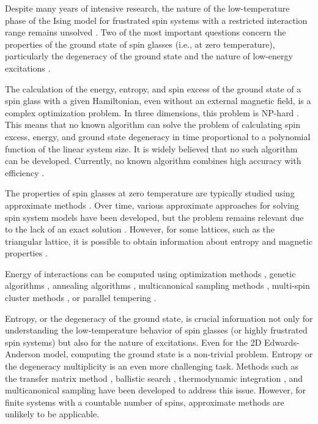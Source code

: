 \documentclass[preprint,12pt]{elsarticle}
\begin{document}
	Despite many years of intensive research, the nature of the low-temperature phase of the Ising model for frustrated spin systems with a restricted interaction range remains unsolved \cite{roma2010ground, newman2023proof}. Two of the most important questions concern the properties of the ground state of spin glasses (i.e., at zero temperature), particularly the degeneracy of the ground state and the nature of low-energy excitations \cite{newman2022ground}.
	
	The calculation of the energy, entropy, and spin excess of the ground state of a spin glass with a given Hamiltonian, even without an external magnetic field, is a complex optimization problem. In three dimensions, this problem is NP-hard \cite{barahona1982computational, hartmann2002optimization}. This means that no known algorithm can solve the problem of calculating spin excess, energy, and ground state degeneracy in time proportional to a polynomial function of the linear system size. It is widely believed that no such algorithm can be developed. Currently, no known algorithm combines high accuracy with efficiency \cite{fan2023searching}.
		
	The properties of spin glasses at zero temperature are typically studied using approximate methods \cite{roma2009ground, perez2012ground}. Over time, various approximate approaches for solving spin system models have been developed, but the problem remains relevant due to the lack of an exact solution \cite{rybin2022hybrid, makarova2023canonical, farias2024differentiable, jabar2024magnetic}. However, for some lattices, such as the triangular lattice, it is possible to obtain information about entropy and magnetic properties \cite{jurvcivsinova2024classical}.
	
	Energy of interactions can be computed using optimization methods \cite{hartmann2002optimization, hartmann2004new}, genetic algorithms \cite{holland1992adaptation}, annealing algorithms \cite{kirkpatrick1983optimization}, multicanonical sampling methods \cite{berg1994ground, shevchenko2017multicanonical}, multi-spin cluster methods \cite{makarova2023canonical}, or parallel tempering \cite{PhysRevB.50.16444, roma2009ground}.
	
	Entropy, or the degeneracy of the ground state, is crucial information not only for understanding the low-temperature behavior of spin glasses (or highly frustrated spin systems) but also for the nature of excitations. Even for the 2D Edwards-Anderson model, computing the ground state is a non-trivial problem. Entropy or the degeneracy multiplicity is an even more challenging task. Methods such as the transfer matrix method \cite{PhysRevB.22.288, cheung1983equilibrium, kolan1982ground}, ballistic search \cite{hartmann2000ground}, thermodynamic integration \cite{kirkpatrick1977frustration, binder1985monte, roma2004ground}, and multicanonical sampling \cite{berg1994ground, shevchenko2017multicanonical} have been developed to address this issue. However, for finite systems with a countable number of spins, approximate methods are unlikely to be applicable.  
	
\end{document}
